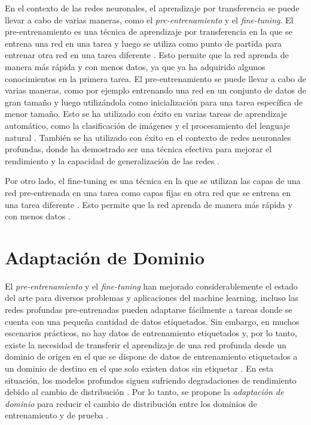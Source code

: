 En el contexto de las redes neuronales, el aprendizaje por transferencia se puede llevar a cabo de varias maneras, como
el {\it pre-entrenamiento} y el {\it fine-tuning}. El pre-entrenamiento es una técnica de aprendizaje por transferencia
en la que se entrena una red en una tarea y luego se utiliza como punto de partida para entrenar otra red en una tarea
diferente \parencite{erhan2010does}. Esto permite que la red aprenda de manera más rápida y con menos datos, ya que ya ha adquirido
algunos conocimientos en la primera tarea. El pre-entrenamiento se puede llevar a cabo de varias maneras, como por
ejemplo entrenando una red en un conjunto de datos de gran tamaño y luego utilizándola como inicialización para una
tarea específica de menor tamaño. Esto se ha utilizado con éxito en varias tareas de aprendizaje automático, como la
clasificación de imágenes \parencite{chen2021pretrained} y el procesamiento del lenguaje natural \parencite{liu2019text}. También se ha utilizado con éxito en el contexto de redes neuronales profundas, donde ha
demostrado ser una técnica efectiva para mejorar el rendimiento y la capacidad de generalización de las redes \parencite{girshick2014rich}.

Por otro lado, el fine-tuning es una técnica en la que se utilizan las capas de una red pre-entrenada en una tarea como
capas fijas en otra red que se entrena en una tarea diferente \parencite{yosinski2014transferable}. Esto permite que la red aprenda de manera más rápida y con menos datos \parencite{howard2018universal}.

\section{Adaptación de Dominio}
El {\it pre-entrenamiento} y el {\it fine-tuning} han mejorado considerablemente el estado del arte para diversos
problemas y aplicaciones del machine learning, incluso las redes profundas pre-entrenadas pueden adaptarse fácilmente a
tareas donde se cuenta con una pequeña cantidad de datos etiquetados. Sin embargo, en muchos escenarios prácticos, no
hay datos de entrenamiento etiquetados y, por lo tanto, existe la necesidad de transferir el aprendizaje de una red
profunda desde un dominio de origen en el que se dispone de datos de entrenamiento etiquetados a un dominio de destino
en el que solo existen datos sin etiquetar \parencite{glorot2011domain}. En esta situación, los modelos profundos siguen sufriendo degradaciones de rendimiento debido
al cambio de distribución \parencite{quinonero2008dataset}. Por lo tanto, se propone la {\it adaptación de dominio} para reducir el cambio de
distribución entre los dominios de entrenamiento y de prueba \parencite{jiang2022machine}.

